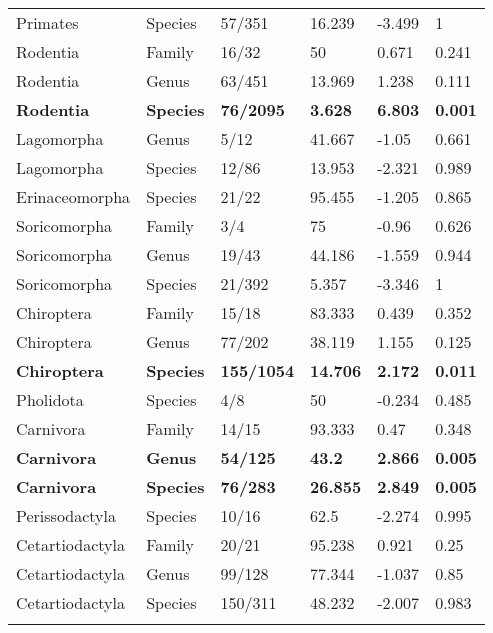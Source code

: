 \begin{longtable}{llllll}
  Primates & Species & 57/351 & 16.239 & -3.499 & 1 \\ 
  Rodentia & Family & 16/32 & 50 & 0.671 & 0.241 \\ 
  Rodentia & Genus & 63/451 & 13.969 & 1.238 & 0.111 \\ 
  \textbf{Rodentia} & \textbf{Species} & \textbf{76/2095} & \textbf{3.628} & \textbf{6.803} & \textbf{0.001} \\ 
  Lagomorpha & Genus & 5/12 & 41.667 & -1.05 & 0.661 \\ 
  Lagomorpha & Species & 12/86 & 13.953 & -2.321 & 0.989 \\ 
  Erinaceomorpha & Species & 21/22 & 95.455 & -1.205 & 0.865 \\ 
  Soricomorpha & Family & 3/4 & 75 & -0.96 & 0.626 \\ 
  Soricomorpha & Genus & 19/43 & 44.186 & -1.559 & 0.944 \\ 
  Soricomorpha & Species & 21/392 & 5.357 & -3.346 & 1 \\ 
  Chiroptera & Family & 15/18 & 83.333 & 0.439 & 0.352 \\ 
  Chiroptera & Genus & 77/202 & 38.119 & 1.155 & 0.125 \\ 
  \textbf{Chiroptera} & \textbf{Species} & \textbf{155/1054} & \textbf{14.706} & \textbf{2.172} & \textbf{0.011} \\ 
  Pholidota & Species & 4/8 & 50 & -0.234 & 0.485 \\ 
  Carnivora & Family & 14/15 & 93.333 & 0.47 & 0.348 \\ 
  \textbf{Carnivora} & \textbf{Genus} & \textbf{54/125} & \textbf{43.2} & \textbf{2.866} & \textbf{0.005} \\ 
  \textbf{Carnivora} & \textbf{Species} & \textbf{76/283} & \textbf{26.855} & \textbf{2.849} & \textbf{0.005} \\ 
  Perissodactyla & Species & 10/16 & 62.5 & -2.274 & 0.995 \\ 
  Cetartiodactyla & Family & 20/21 & 95.238 & 0.921 & 0.25 \\ 
  Cetartiodactyla & Genus & 99/128 & 77.344 & -1.037 & 0.85 \\ 
  Cetartiodactyla & Species & 150/311 & 48.232 & -2.007 & 0.983 \\ 
   \hline
\hline
\label{Supp_data_structurePD}
\end{longtable}

